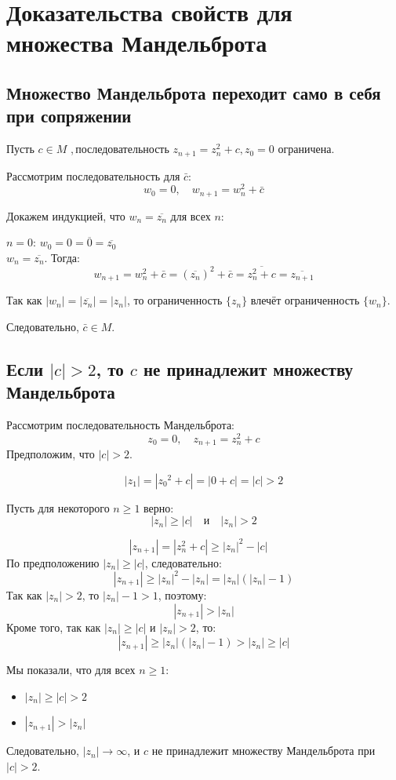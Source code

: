 \section{Доказательства свойств для множества Мандельброта}

\subsection{Множество Мандельброта переходит само в себя при сопряжении}

Пусть \(c \in M\) ,\,последовательность \(z_{n+1} = z_n^2 + c, z_0 = 0\) ограничена.

Рассмотрим последовательность для \(\bar{c}\):
\[
w_0 = 0, \quad w_{n+1} = w_n^2 + \bar{c}
\]

Докажем индукцией, что \(w_n = \overline{z_n}\) для всех \(n\):

\(n=0\): \(w_0 = 0 = \overline{0} = \overline{z_0}\)\\
\(w_n = \overline{z_n}\). Тогда:
  \[
  w_{n+1} = w_n^2 + \bar{c} = (\overline{z_n})^2 + \bar{c} = \overline{z_n^2 + c} = \overline{z_{n+1}}
  \]

Так как \(|w_n| = |\overline{z_n}| = |z_n|\), то ограниченность \(\{z_n\}\) влечёт ограниченность \(\{w_n\}\). 

Следовательно, \(\bar{c} \in M\). 

\subsection{Если \(|c|>2\), то \(c\) не принадлежит множеству Мандельброта}

Рассмотрим последовательность Мандельброта:
\[
z_0 = 0, \quad z_{n+1} = z_n^2 + c
\]
Предположим, что \(|c| > 2\).

\[
|z_1| = |{z_0}^2 + c | = | 0 + c | = |c| > 2
\]

Пусть для некоторого \(n \geq 1\) верно:
\[
|z_n| \geq |c| \quad \text{и} \quad |z_n| > 2
\]

\[
|z_{n+1}| = |z_n^2 + c| \geq |z_n|^2 - |c| \quad
\]
По предположению \(|z_n| \geq |c|\), следовательно:
\[
|z_{n+1}| \geq |z_n|^2 - |z_n| = |z_n|(|z_n| - 1)
\]
Так как \(|z_n| > 2\), то \(|z_n| - 1 > 1\), поэтому:
\[
|z_{n+1}| > |z_n|
\]
Кроме того, так как \(|z_n| \geq |c|\) и \(|z_n| > 2\), то:
\[
|z_{n+1}| \geq |z_n|(|z_n| - 1) > |z_n| \geq |c|
\]

Мы показали, что для всех \(n \geq 1\):
\begin{itemize}
    \item \(|z_n| \geq |c| > 2\)
    \item \(|z_{n+1}| > |z_n|\)
\end{itemize}

Следовательно, \(|z_n| \to \infty\), и \(c\) не принадлежит множеству Мандельброта при \(|c| > 2\). 

